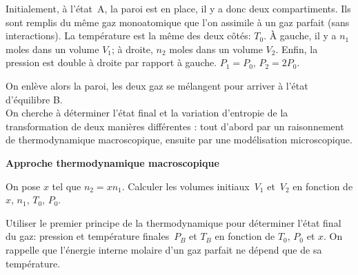 \documentclass[utf8, 11pt]{feuille}
\begin{document}
Initialement, à l'état~A, la paroi est en place, il y a donc deux
compartiments.
Ils sont
remplis du même gaz monoatomique que l'on assimile à un gaz parfait (sans interactions). La température est la même des deux
côtés: $T_0$. À gauche, il y a $n_1$ moles dans un volume $V_1$; à
droite, $n_2$ moles dans un volume $V_2$. Enfin, la pression est double
à droite par rapport à gauche. $P_1 = P_0$, $P_2 = 2 P_0$.

On enlève alors la paroi, les deux gaz se mélangent pour arriver à l'état d'équilibre B.\\
On cherche à déterminer l'état final et la variation d'entropie de la
transformation de deux manières différentes : tout d'abord par un
raisonnement de thermodynamique macroscopique, ensuite par une
modélisation microscopique.

\medskip

{\sffamily\bfseries{Approche thermodynamique macroscopique}}


\question
On pose $x$ tel que $n_2 = x n_1$.
Calculer les volumes initiaux~$V_1$ et~$V_2$ en fonction de $x$,
$n_1$, $T_0$, $P_0$.


\question
Utiliser le premier principe de la thermodynamique pour déterminer l'état final du gaz: pression et température finales~$P_B$ et $T_B$ en fonction de $T_0$, $P_0$ et $x$. On rappelle que l'énergie interne molaire d'un gaz parfait ne dépend que de sa température.
 
\end{document}
